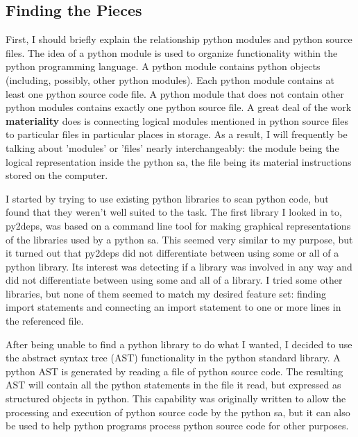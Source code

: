 \documentclass[a4paper,man,natbib,floatsintext]{apa6}
\begin{document}
  \subsection{Finding the Pieces}
  First, I should briefly explain the relationship \Gls{python} modules and \Gls{python} source files. The idea of a \Gls{python} module is used to organize functionality within the \Gls{python} programming language. A \Gls{python} module contains \Gls{python} objects (including, possibly, other \Gls{python} modules). Each \Gls{python} module contains at least one \Gls{python} source code file. A \Gls{python} module that does not contain other \Gls{python} modules contains exactly one \Gls{python} source file. A great deal of the work \textbf{materiality} does is connecting logical modules mentioned in \Gls{python} source files to particular files in particular places in storage. As a result, I will frequently be talking about 'modules' or 'files' nearly interchangeably: the module being the logical representation inside the \Gls{python} \gls{sa}, the file being its material instructions stored on the computer.

  I started by trying to use existing \gls{python} libraries to scan \Gls{python} code, but found that they weren't well suited to the task. The first library I looked in to, py2deps, was based on a command line tool for making graphical representations of the libraries used by a \Gls{python} \gls{sa}. This seemed very similar to my purpose, but it turned out that py2deps did not differentiate between using some or all of a python library. Its interest was detecting if a library was involved in any way and did not differentiate between using some and all of a library. I tried some other libraries, but none of them seemed to match my desired feature set: finding import statements and connecting an import statement to one or more lines in the referenced file.

  After being unable to find a \Gls{python} library to do what I wanted, I decided to use the abstract syntax tree (AST) functionality in the \Gls{python} standard library. A \Gls{python} AST is generated by reading a file of \Gls{python} source code. The resulting AST will contain all the \Gls{python} statements in the file it read, but expressed as structured objects in \Gls{python}. This capability was originally written to allow the processing and execution of \Gls{python} source code by the \Gls{python} \gls{sa}, but it can also be used to help \Gls{python} programs process \Gls{python} source code for other purposes.
\end{document}

